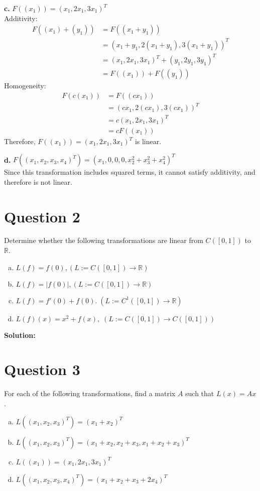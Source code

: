 \documentclass{article}
\begin{document}
\vspace{0.25cm}
\noindent\textbf{c.} $ F((x_1)) = (x_1, 2x_1, 3x_1)^T $ \\
Additivity:
\begin{align*}
    F((x_1) + (y_1)) &= F((x_1 + y_1)) \\
    &= (x_1 + y_1, 2(x_1 + y_1), 3(x_1 + y_1))^T \\
    &= (x_1, 2x_1, 3x_1)^T + (y_1, 2y_1, 3y_1)^T \\
    &= F((x_1)) + F((y_1))
\end{align*}
Homogeneity:
\begin{align*}
    F(c(x_1)) &= F((cx_1)) \\
    &= (cx_1, 2(cx_1), 3(cx_1))^T \\
    &= c(x_1, 2x_1, 3x_1)^T \\
    &= cF((x_1))
\end{align*}
Therefore, $F((x_1)) = (x_1, 2x_1, 3x_1)^T$ is linear.

\vspace{0.25cm}
\noindent\textbf{d.} $ F((x_1, x_2, x_3, x_4)^T) = (x_1, 0, 0, 0, x_2^2 + x_3^2 + x_4^2)^T $\\
Since this transformation includes squared terms, it cannot satisfy additivity, and therefore is not linear.

\section*{Question 2}
Determine whether the following transformations are linear from $C([0,1])$ to $\mathbb{R}$.
\begin{enumerate}[a.]
    \item $ L(f) = f(0), (L := C([0,1]) \to \mathbb{R}) $
    \item $ L(f) = |f(0)|, (L := C([0,1]) \to \mathbb{R}) $
    \item $ L(f) = f'(0) + f(0). \; (L := C^1([0,1]) \to \mathbb{R}) $
    \item $ L(f)(x) = x^2 + f(x), \; (L := C([0,1]) \to C([0,1])) $
\end{enumerate}

\noindent\textbf{Solution:}

\section*{Question 3}
For each of the following transformations, find a matrix $A$ such that $L(x) = Ax$.
\begin{enumerate}[a.]
    \item $ L((x_1, x_2, x_3)^T) = (x_1 + x_2)^T $
    \item $ L((x_1, x_2, x_3)^T) = (x_1 + x_2, x_2 + x_3, x_1 + x_2 + x_3)^T $
    \item $ L((x_1)) = (x_1, 2x_1, 3x_1)^T $
    \item $ L((x_1, x_2, x_3, x_4)^T) = (x_1 + x_2 + x_3 + 2x_4)^T $
\end{enumerate}
\end{document}
